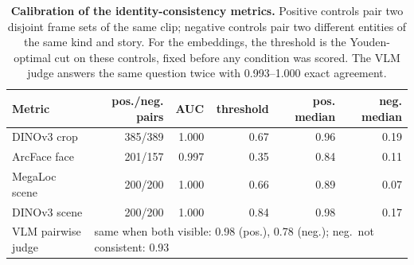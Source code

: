\begin{table}[t]
\centering
\caption{\textbf{Calibration of the identity-consistency metrics.} Positive controls pair two disjoint frame sets of the same clip; negative controls pair two different entities of the same kind and story. For the embeddings, the threshold is the Youden-optimal cut on these controls, fixed before any condition was scored. The VLM judge answers the same question twice with 0.993--1.000 exact agreement.}
\label{tab:identity-calibration}
\footnotesize
\setlength{\tabcolsep}{4pt}
\begin{tabular}{@{}l r r r r r@{}}
\toprule
Metric & pos./neg. pairs & AUC & threshold & pos. median & neg. median \\
\midrule
DINOv3 crop & 385/389 & 1.000 & 0.67 & 0.96 & 0.19 \\
ArcFace face & 201/157 & 0.997 & 0.35 & 0.84 & 0.11 \\
MegaLoc scene & 200/200 & 1.000 & 0.66 & 0.89 & 0.07 \\
DINOv3 scene & 200/200 & 1.000 & 0.84 & 0.98 & 0.17 \\
\midrule
VLM pairwise judge & \multicolumn{5}{l}{same when both visible: 0.98 (pos.), 0.78 (neg.); neg.\ not consistent: 0.93} \\
\bottomrule
\end{tabular}
\end{table}
